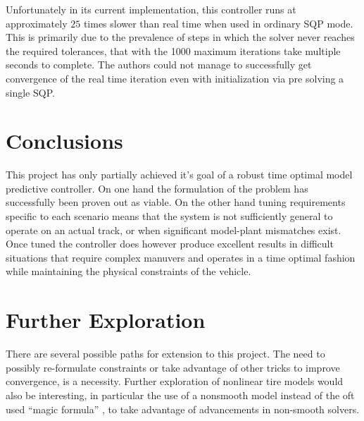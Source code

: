 \documentclass[conference,11pt]{IEEEtran}
\begin{document}
Unfortunately in its current implementation, this controller runs at approximately $25$ times slower than real time when used in ordinary SQP mode. This is primarily due to the prevalence of
steps in which the solver never reaches the required tolerances, that with the 1000 maximum iterations take multiple seconds to complete. The authors could not manage to successfully get convergence
of the real time iteration even with initialization via pre solving a single SQP.

\section{Conclusions}
This project has only partially achieved it's goal of a robust time optimal model predictive controller. On one hand the formulation of the problem has successfully been proven out as viable.
On the other hand tuning requirements specific to each scenario means that the system is not sufficiently general to operate on an actual track, or when significant model-plant mismatches exist.
Once tuned the controller does however produce excellent results in difficult situations that require complex manuvers and operates in a time optimal fashion while maintaining the physical
constraints of the vehicle. 



\section{Further Exploration}

There are several possible paths for extension to this project. The need to possibly re-formulate constraints or take advantage of other tricks to improve convergence, is a necessity.
Further exploration of nonlinear tire models would also be interesting, in particular the use of a nonsmooth model instead of the oft used ``magic formula'' \cite{PAUWELUSSEN2015239}, to take
advantage of advancements in non-smooth solvers.



\end{document}

